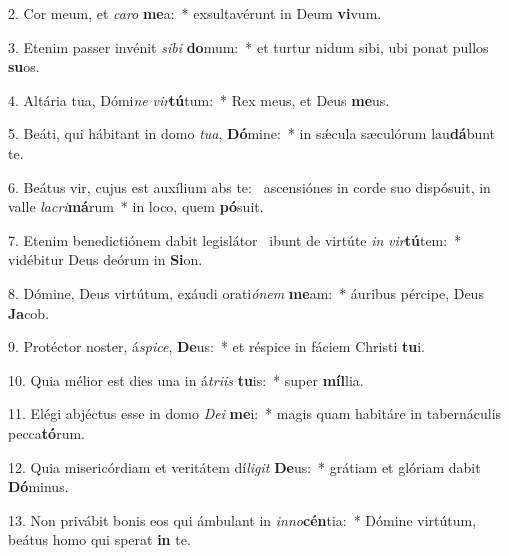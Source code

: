 2. Cor meum, et \textit{ca}\textit{ro} \textbf{me}a:~*  exsultavérunt in Deum \textbf{vi}vum.\

3. Etenim passer invénit \textit{si}\textit{bi} \textbf{do}mum:~*  et turtur nidum sibi, ubi ponat pullos \textbf{su}os.\

4. Altária tua, Dómi\textit{ne} \textit{vir}\textbf{tú}tum:~*  Rex meus, et Deus \textbf{me}us.\

5. Beáti, qui hábitant in domo \textit{tu}\textit{a}, \textbf{Dó}mine:~*  in sǽcula sæculórum lau\textbf{dá}bunt te.\

6. Beátus vir, cujus est auxílium abs te: \dag\  ascensiónes in corde suo dispósuit, in valle \textit{la}\textit{cri}\textbf{má}rum~*  in loco, quem \textbf{pó}suit.\

7. Etenim benedictiónem dabit legislátor \dag\  ibunt de virtúte \textit{in} \textit{vir}\textbf{tú}tem:~*  vidébitur Deus deórum in \textbf{Si}on.\

8. Dómine, Deus virtútum, exáudi orati\textit{ó}\textit{nem} \textbf{me}am:~*  áuribus pércipe, Deus \textbf{Ja}cob.\

9. Protéctor noster, á\textit{spi}\textit{ce}, \textbf{De}us:~*  et réspice in fáciem Christi \textbf{tu}i.\

10. Quia mélior est dies una in á\textit{tri}\textit{is} \textbf{tu}is:~*  super \textbf{míl}lia.\

11. Elégi abjéctus esse in domo \textit{De}\textit{i} \textbf{me}i:~*  magis quam habitáre in tabernáculis pecca\textbf{tó}rum.\

12. Quia misericórdiam et veritátem dí\textit{li}\textit{git} \textbf{De}us:~*  grátiam et glóriam dabit \textbf{Dó}minus.\

13. Non privábit bonis eos qui ámbulant in \textit{in}\textit{no}\textbf{cén}tia:~*  Dómine virtútum, beátus homo qui sperat \textbf{in} te.\

